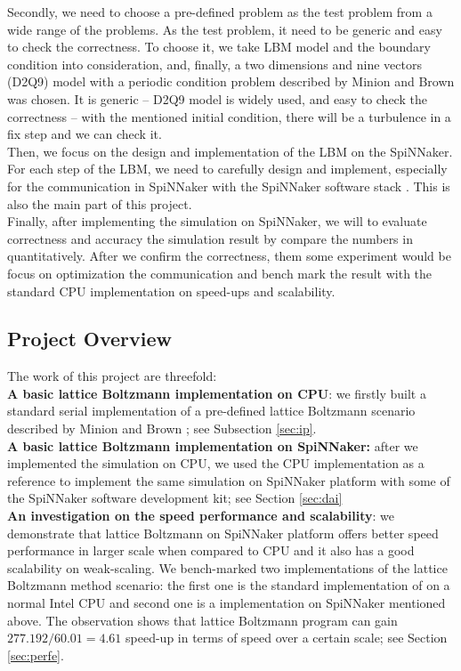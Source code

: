 Secondly, we need to choose a pre-defined problem as the test problem from a wide range of the problems. As the test problem, it need to be generic and easy to check the correctness. To choose it, we take LBM model and the boundary condition into consideration, and, finally, a two dimensions and nine vectors (D2Q9) model with a periodic condition problem described by Minion and Brown \cite{minion1997performance} was chosen. It is generic -- D2Q9 model is widely used, and easy to check the correctness -- with the mentioned initial condition, there will be a turbulence in a fix step and we can check it.\\

Then, we focus on the design and implementation of the LBM on the SpiNNaker. For each step of the LBM, we need to carefully design and implement, especially for the communication in SpiNNaker with the SpiNNaker software stack \cite{software_spinn}. This is also the main part of this project.\\

Finally, after implementing the simulation on SpiNNaker, we will to evaluate correctness and accuracy the simulation result by compare the numbers in quantitatively. After we confirm the correctness, them some experiment would be focus on optimization the communication and bench mark the result with the standard CPU implementation on speed-ups and scalability.\\

\subsection{Project Overview}

The work of this project are threefold:\\

 \textbf{A basic lattice Boltzmann implementation on CPU}: we firstly built a standard serial implementation of a pre-defined lattice Boltzmann scenario described by Minion and Brown \cite{minion1997performance}; see Subsection \ref{sec:ip}. \\

 \textbf{A basic lattice Boltzmann implementation on SpiNNaker:} after we implemented the simulation on CPU, we used the CPU implementation as a reference to implement the same simulation on SpiNNaker platform with some of the SpiNNaker software development kit; see Section \ref{sec:dai}\\

\textbf{An investigation on the speed performance and scalability}: we demonstrate that lattice Boltzmann on SpiNNaker platform offers better speed performance in larger scale when compared to CPU and it also has a good scalability on weak-scaling. We bench-marked two implementations of the lattice Boltzmann method scenario: the first one is the standard implementation of on a normal Intel CPU and second one is a implementation on SpiNNaker mentioned above. The observation shows that lattice Boltzmann program can gain  $277.192 / 60.01 = 4.61$ speed-up in terms of speed over a certain scale; see Section \ref{sec:perfe}.



